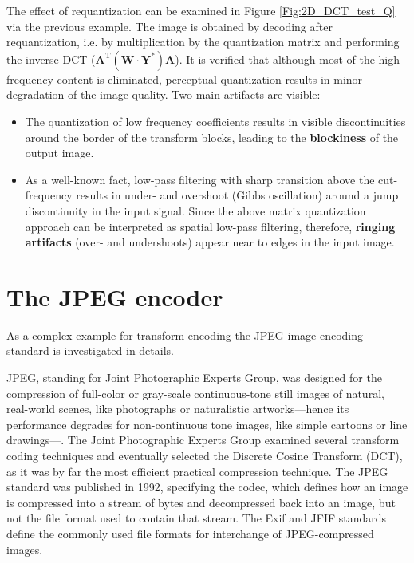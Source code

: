 \vspace{3mm}
The effect of requantization can be examined in Figure \ref{Fig:2D_DCT_test_Q} via the previous example.
The image is obtained by decoding after requantization, i.e. by multiplication by the quantization matrix and performing the inverse DCT ($\mathbf{A}^{\mathrm{T}} \left( \mathbf{W} \cdot \mathbf{Y^*} \right) \mathbf{A}$).
It is verified that although most of the high frequency content is eliminated, perceptual quantization results in minor degradation of the image quality.
Two main artifacts are visible:
\begin{itemize}
\item The quantization of low frequency coefficients results in visible discontinuities around the border of the transform blocks, leading to the \textbf{blockiness} of the output image.
\item As a well-known fact, low-pass filtering with sharp transition above the cut-frequency results in under- and overshoot (Gibbs oscillation) around a jump discontinuity in the input signal.
Since the above matrix quantization approach can be interpreted as spatial low-pass filtering, therefore, \textbf{ringing artifacts} (over- and undershoots) appear near to edges in the input image.
\end{itemize}


\section{The JPEG encoder}

As a complex example for transform encoding the JPEG image encoding standard is investigated in details.

JPEG, standing for Joint Photographic Experts Group, was designed for the compression of full-color or gray-scale continuous-tone still images of natural, real-world scenes, like photographs or naturalistic artworks---hence its performance degrades for non-continuous tone images, like simple cartoons or line drawings---.
The Joint Photographic Experts Group examined several transform coding techniques and eventually selected the Discrete Cosine Transform (DCT), as it was by far the most efficient practical compression technique. 
The JPEG standard was published in 1992, specifying the codec, which defines how an image is compressed into a stream of bytes and decompressed back into an image, but not the file format used to contain that stream.
The Exif and JFIF standards define the commonly used file formats for interchange of JPEG-compressed images. 

